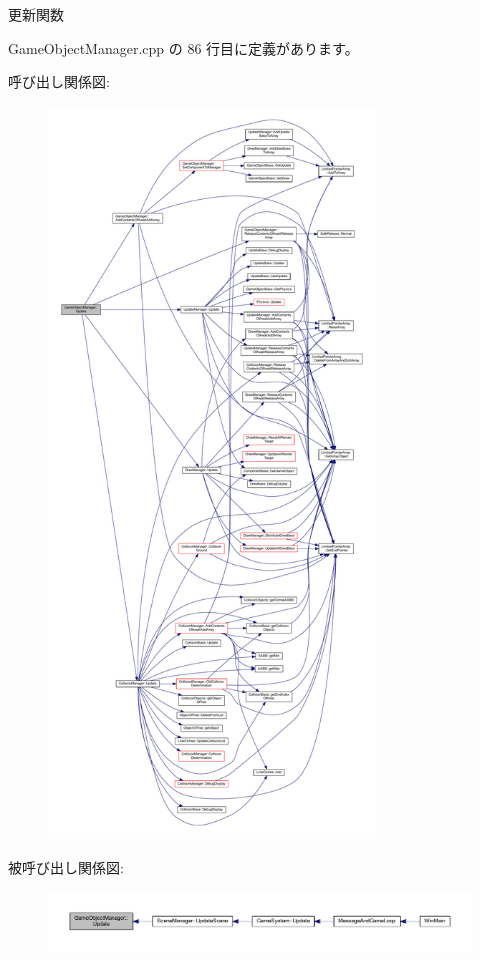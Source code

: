 更新関数 



 Game\+Object\+Manager.\+cpp の 86 行目に定義があります。

呼び出し関係図\+:
\nopagebreak
\begin{figure}[H]
\begin{center}
\leavevmode
\includegraphics[height=550pt]{class_game_object_manager_a6f053b1c655de6ca1c9a8fa9b6e118ae_cgraph}
\end{center}
\end{figure}
被呼び出し関係図\+:
\nopagebreak
\begin{figure}[H]
\begin{center}
\leavevmode
\includegraphics[width=350pt]{class_game_object_manager_a6f053b1c655de6ca1c9a8fa9b6e118ae_icgraph}
\end{center}
\end{figure}


